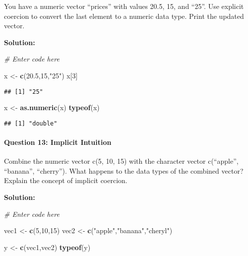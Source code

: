 \documentclass[
]{article}
\newenvironment{Shaded}{\begin{snugshade}}{\end{snugshade}}
\newcommand{\CommentTok}[1]{\textcolor[rgb]{0.56,0.35,0.01}{\textit{#1}}}
\newcommand{\DecValTok}[1]{\textcolor[rgb]{0.00,0.00,0.81}{#1}}
\newcommand{\FloatTok}[1]{\textcolor[rgb]{0.00,0.00,0.81}{#1}}
\newcommand{\FunctionTok}[1]{\textcolor[rgb]{0.13,0.29,0.53}{\textbf{#1}}}
\newcommand{\NormalTok}[1]{#1}
\newcommand{\OtherTok}[1]{\textcolor[rgb]{0.56,0.35,0.01}{#1}}
\newcommand{\StringTok}[1]{\textcolor[rgb]{0.31,0.60,0.02}{#1}}
\begin{document}
You have a numeric vector ``prices'' with values 20.5, 15, and ``25''.
Use explicit coercion to convert the last element to a numeric data
type. Print the updated vector.

\textbf{Solution:}

\begin{Shaded}
\begin{Highlighting}[]
\CommentTok{\# Enter code here}

\NormalTok{x }\OtherTok{\textless{}{-}} \FunctionTok{c}\NormalTok{(}\FloatTok{20.5}\NormalTok{,}\DecValTok{15}\NormalTok{,}\StringTok{"25"}\NormalTok{)}
\NormalTok{x[}\DecValTok{3}\NormalTok{]}
\end{Highlighting}
\end{Shaded}

\begin{verbatim}
## [1] "25"
\end{verbatim}

\begin{Shaded}
\begin{Highlighting}[]
\NormalTok{x }\OtherTok{\textless{}{-}} \FunctionTok{as.numeric}\NormalTok{(x)}
\FunctionTok{typeof}\NormalTok{(x)}
\end{Highlighting}
\end{Shaded}

\begin{verbatim}
## [1] "double"
\end{verbatim}

\hypertarget{question-13-implicit-intuition}{%
\paragraph{Question 13: Implicit
Intuition}\label{question-13-implicit-intuition}}

Combine the numeric vector c(5, 10, 15) with the character vector
c(``apple'', ``banana'', ``cherry''). What happens to the data types of
the combined vector? Explain the concept of implicit coercion.

\textbf{Solution:}

\begin{Shaded}
\begin{Highlighting}[]
\CommentTok{\# Enter code here}

\NormalTok{vec1 }\OtherTok{\textless{}{-}} \FunctionTok{c}\NormalTok{(}\DecValTok{5}\NormalTok{,}\DecValTok{10}\NormalTok{,}\DecValTok{15}\NormalTok{)}
\NormalTok{vec2 }\OtherTok{\textless{}{-}} \FunctionTok{c}\NormalTok{(}\StringTok{"apple"}\NormalTok{,}\StringTok{"banana"}\NormalTok{,}\StringTok{"cheryl"}\NormalTok{)}

\NormalTok{y }\OtherTok{\textless{}{-}} \FunctionTok{c}\NormalTok{(vec1,vec2)}
\FunctionTok{typeof}\NormalTok{(y)}
\end{Highlighting}
\end{Shaded}
\end{document}
